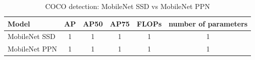\documentclass[10pt,twocolumn,letterpaper]{article}
\begin{document}
\begin{table}[t]
\begin{center}
\begin{tabular}{l|c|c|c|c|c}
Model & AP & AP50 & AP75 & FLOPs & number of parameters \\
\hline
\hline
MobileNet SSD & 1 & 1 & 1 & 1 & 1 \\
\hline
MobileNet PPN & 1 & 1 & 1 & 1 & 1 \\
\end{tabular}
\end{center}
\caption{COCO detection: MobileNet SSD vs MobileNet PPN}
\end{table}




{\small


}
\end{document}
